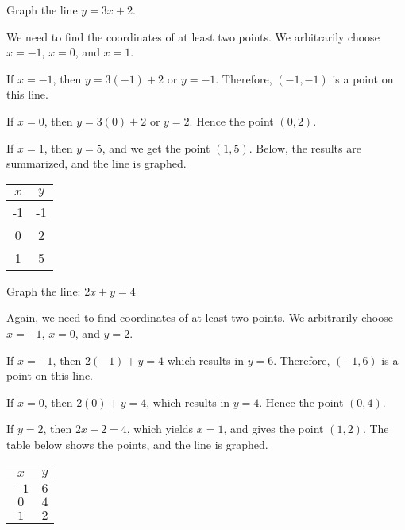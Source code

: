 \begin{example}
Graph the line \(y = 3x + 2\).
\end{example}

\begin{solution} We need to find the coordinates of at least two points. We arbitrarily choose \(x = -1\), \(x = 0\), and \(x = 1\).

If \(x = -1\), then \(y = 3(-1) + 2\) or \(y = -1\). Therefore, \((-1, -1)\) is a point on this line.

If \(x = 0\), then \(y = 3(0) + 2\) or \(y = 2\). Hence the point \((0, 2)\).

If \(x = 1\), then \(y = 5\), and we get the point \((1, 5)\). Below, the results are summarized, and the line is graphed.

\begin{center}
\begin{tabular}{c|c}
    \(x\) & \(y\) \\
    \hline
    -1 & -1 \\
    0  & 2  \\
    1  & 5
\end{tabular}
\end{center}

\end{solution}

\begin{example}
Graph the line: $2x + y = 4$
\end{example}

\begin{solution} Again, we need to find coordinates of at least two points. We arbitrarily choose $x = -1$, $x = 0$, and $y = 2$.

If $x = -1$, then $2(-1) + y = 4$ which results in $y = 6$. Therefore, $(-1, 6)$ is a point on this line.

If $x = 0$, then $2(0) + y = 4$, which results in $y = 4$. Hence the point $(0, 4)$.

If $y = 2$, then $2x + 2 = 4$, which yields $x = 1$, and gives the point $(1, 2)$. The table below shows the points, and the line is graphed.


\begin{center}
\begin{tabular}{c|c}
    $x$ & $y$ \\
    \hline
    $-1$ & $6$ \\
    $0$  & $4$ \\
    $1$  & $2$
\end{tabular}
\end{center}
\end{solution}

